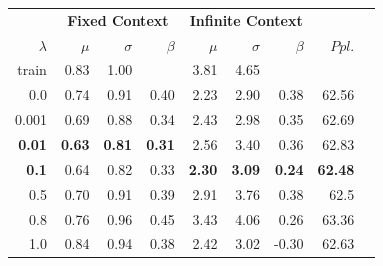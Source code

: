 \documentclass[11pt,a4paper]{article}
\begin{document}
\begin{table}[hbt!]
\small
\centering
    \begin{tabular}{rrrrrrrrr}%
     \toprule
  
  
      & \multicolumn{3}{c}{\textbf{Fixed Context}}
          & \multicolumn{3}{c}{\textbf{Infinite Context} } &  \multicolumn{1}{c}{}  \\%
    \textbf{$\lambda$}  & \textbf{$\mu$} & \textbf{$\sigma$}  & \textbf{$\beta$} & \textbf{$\mu$} & \textbf{$\sigma$}  & \textbf{$\beta$} &   \textbf{$Ppl.$}\\
      \midrule      
     
train & 0.83 & 1.00 &  & 3.81 & 4.65 &  &  \\

0.0 & 0.74 & 0.91 & 0.40 & 2.23 & 2.90 & 0.38 & 62.56 \\

0.001 & 0.69 & 0.88 & 0.34 & 2.43 & 2.98 & 0.35 & 62.69 \\

\textbf{0.01} & \textbf{0.63} & \textbf{0.81} & \textbf{0.31} & 2.56 & 3.40 & 0.36 & 62.83 \\

\textbf{0.1} & 0.64 & 0.82 & 0.33 & \textbf{2.30} & \textbf{3.09} & \textbf{0.24} & \textbf{62.48} \\

0.5 & 0.70 & 0.91 & 0.39 & 2.91 & 3.76 & 0.38 & 62.5 \\

0.8 & 0.76 & 0.96 & 0.45 & 3.43 & 4.06 & 0.26 & 63.36 \\

1.0 & 0.84 & 0.94 & 0.38 & 2.42 & 3.02 & -0.30 & 62.63 \\
      


\end{tabular}
\end{table}
\end{document}
